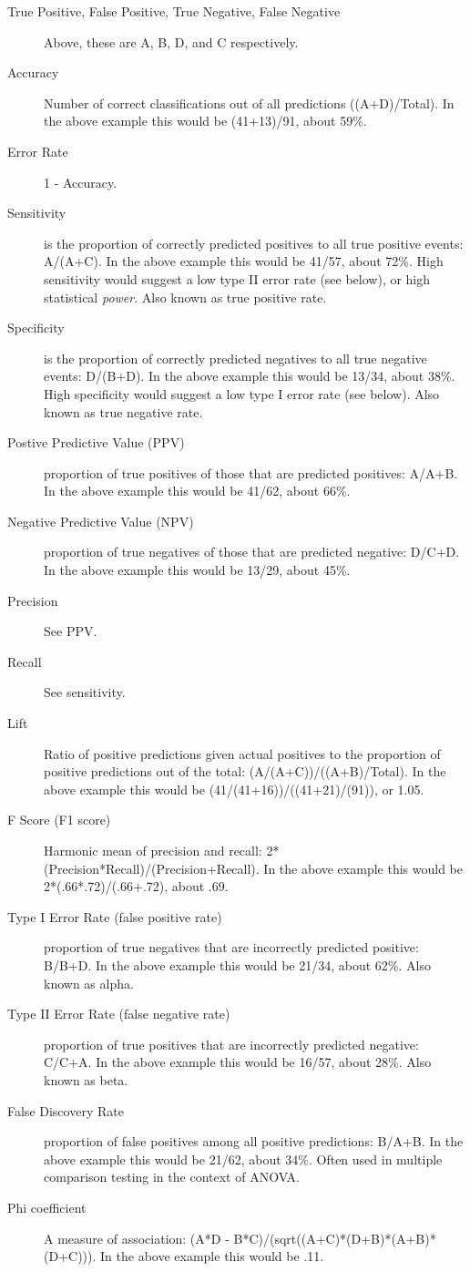 \documentclass[english,nohyper,titlepage]{tufte-handout}\usepackage{knitr}
\begin{document}
\small
\begin{description}
  \item[True Positive, False Positive, True Negative, False Negative] Above, these are A, B, D, and C respectively.
  \item[Accuracy] Number of correct classifications out of all predictions ((A+D)/Total). In the above example this would be (41+13)/91, about 59\%.
  \item[Error Rate] 1 - Accuracy.
  \item[Sensitivity] is the proportion of correctly predicted positives to all true positive events: A/(A+C).  In the above example this would be 41/57, about 72\%. High sensitivity would suggest a low type II error rate (see below), or high statistical \emph{power}. Also known as true positive rate.
  \item[Specificity] is the proportion of correctly predicted negatives to all true negative events: D/(B+D).  In the above example this would be 13/34, about 38\%. High specificity would suggest a low type I error rate (see below). Also known as true negative rate.
  \item[Postive Predictive Value (PPV)] proportion of true positives of those that are predicted positives: A/A+B. In the above example this would be 41/62, about 66\%.
  \item[Negative Predictive Value (NPV)] proportion of true negatives of those that are predicted negative: D/C+D. In the above example this would be 13/29, about 45\%.
  \item[Precision]  See PPV.
  \item[Recall] See sensitivity. 
  \item[Lift] Ratio of positive predictions given actual positives to the proportion of positive predictions out of the total: (A/(A+C))/((A+B)/Total). In the above example this would be (41/(41+16))/((41+21)/(91)), or 1.05.
  \item[F Score (F1 score)] Harmonic mean of precision and recall: 2*(Precision*Recall)/(Precision+Recall). In the above example this would be 2*(.66*.72)/(.66+.72), about .69.  
  \item[Type I Error Rate (false positive rate)] proportion of true negatives that are incorrectly predicted positive: B/B+D. In the above example this would be 21/34, about 62\%.  Also known as alpha.
  \item[Type II Error Rate (false negative rate)] proportion of true positives that are incorrectly predicted negative: C/C+A. In the above example this would be 16/57, about 28\%. Also known as beta.
  \item[False Discovery Rate] proportion of false positives among all positive predictions: B/A+B. In the above example this would be 21/62, about 34\%.  Often used in multiple comparison testing in the context of ANOVA.
  \item[Phi coefficient] A measure of association: (A*D - B*C)/(sqrt((A+C)*(D+B)*(A+B)*(D+C))).  In the above example this would be .11.
\end{description}
\normalsize
\end{document}
